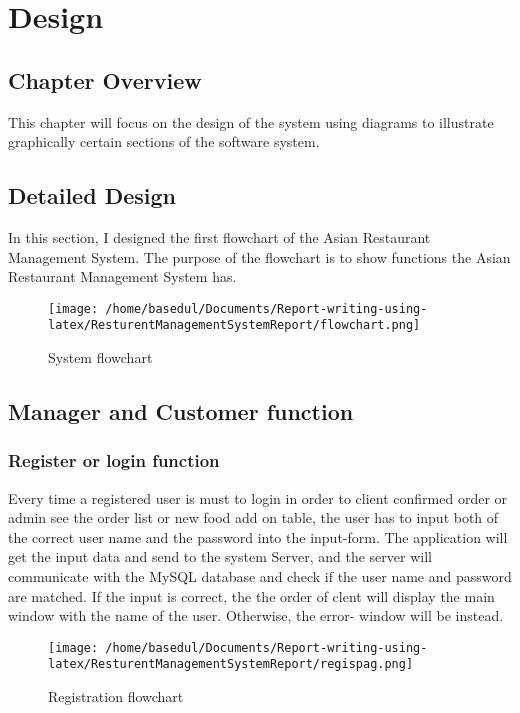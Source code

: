 \documentclass[12pt,a4paper]{article}
\newcommand\tab[1][1cm]{\hspace*{#1}}
\begin{document}
	
	
\newpage

\section{Design}
	\subsection{Chapter Overview}
	\tab This chapter will focus on the design of the system using diagrams to illustrate graphically certain
sections of the software system.

	\subsection{Detailed Design}
	\tab In this section, I designed the first flowchart of the Asian Restaurant Management System. The purpose
of the flowchart is to show functions the Asian Restaurant Management System has.	
	
		\begin{figure}[H]
		\centering
		\texttt{[image: /home/basedul/Documents/Report-writing-using-latex/ResturentManagementSystemReport/flowchart.png]}
		\caption{System flowchart}
		\label{fig:flowchart} 
	\end{figure}
	\subsection{Manager and Customer function}
	\subsubsection{Register or login function}
	\tab Every time a registered user is must to login in order to client confirmed order or admin see the order list or new food add on table, the
user has to input both of the correct user name and the password into the input-form. The
application will get the input data and send to the system Server, and the server will
communicate with the MySQL database and check if the user name and password are	matched. If the input is correct, the the order of clent will display the main window with the
name of the user. Otherwise, the error-
window will be instead.
		\begin{figure}[H]
		\centering
		\texttt{[image: /home/basedul/Documents/Report-writing-using-latex/ResturentManagementSystemReport/regispag.png]}
		\caption{Registration flowchart}
		\label{fig:regiflow} 
		\end{figure}
	
\end{document}
